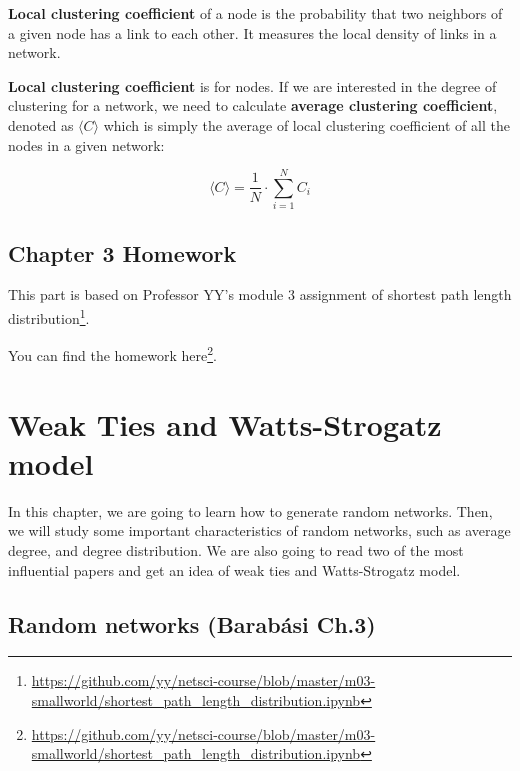 \documentclass[
]{krantz}
\makeatletter
\renewcommand{\href}[2]{#2\footnote{\url{#1}}}
\newenvironment{kframe}{%
\medskip{}
\setlength{\fboxsep}{.8em}
 \def\at@end@of@kframe{}%
 \ifinner\ifhmode%
  \def\at@end@of@kframe{\end{minipage}}%
  \begin{minipage}{\columnwidth}%
 \fi\fi%
 \def\FrameCommand##1{\hskip\@totalleftmargin \hskip-\fboxsep
 \colorbox{shadecolor}{##1}\hskip-\fboxsep
     \hskip-\linewidth \hskip-\@totalleftmargin \hskip\columnwidth}%
 \MakeFramed {\advance\hsize-\width
   \@totalleftmargin\z@ \linewidth\hsize
   \@setminipage}}%
 {\par\unskip\endMakeFramed%
 \at@end@of@kframe}
\newenvironment{rmdblock}[1]
  {
  \begin{itemize}
  \renewcommand{\labelitemi}{
    \raisebox{-.7\height}[0pt][0pt]{
      {\setkeys{Gin}{width=3em,keepaspectratio}\texttt{[image: images/\#1]}}
    }
  }
  \setlength{\fboxsep}{1em}
  \begin{kframe}
  \item
  }
  {
  \end{kframe}
  \end{itemize}
  }
\newenvironment{rmdnote}
  {\begin{rmdblock}{note}}
  {\end{rmdblock}}
\makeatother
\begin{document}
\textbf{Local clustering coefficient} of a node is the probability that two neighbors of a given node has a link to each other. It measures the local density of links in a network.

\textbf{Local clustering coefficient} is for nodes. If we are interested in the degree of clustering for a network, we need to calculate \textbf{average clustering coefficient}, denoted as \(\langle C \rangle\) which is simply the average of local clustering coefficient of all the nodes in a given network:

\begin{equation}
   \langle C \rangle = \frac{1}{N} \cdot \sum_{i = 1}^N C_i
\label{eq:avergeClustering}
\end{equation}

\hypertarget{chapter-3-homework}{%
\section{Chapter 3 Homework}\label{chapter-3-homework}}

\begin{rmdnote}
This part is based on Professor YY's module 3 assignment of \href{https://github.com/yy/netsci-course/blob/master/m03-smallworld/shortest_path_length_distribution.ipynb}{shortest path length distribution}.
\end{rmdnote}

You can find the homework \href{https://github.com/yy/netsci-course/blob/master/m03-smallworld/shortest_path_length_distribution.ipynb}{here}.

\hypertarget{weak-ties-and-watts-strogatz-model}{%
\chapter{Weak Ties and Watts-Strogatz model}\label{weak-ties-and-watts-strogatz-model}}

In this chapter, we are going to learn how to generate random networks. Then, we will study some important characteristics of random networks, such as average degree, and degree distribution. We are also going to read two of the most influential papers and get an idea of weak ties and Watts-Strogatz model.

\hypertarget{random-networks-barabuxe1si-ch.3}{%
\section{Random networks (Barabási Ch.3)}\label{random-networks-barabuxe1si-ch.3}}
\end{document}
